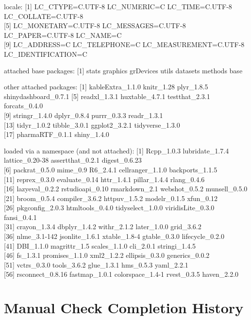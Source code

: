 \documentclass[]{article}
\begin{document}
locale: {[}1{]} LC\_CTYPE=C.UTF-8 LC\_NUMERIC=C LC\_TIME=C.UTF-8
LC\_COLLATE=C.UTF-8\\
{[}5{]} LC\_MONETARY=C.UTF-8 LC\_MESSAGES=C.UTF-8 LC\_PAPER=C.UTF-8
LC\_NAME=C\\
{[}9{]} LC\_ADDRESS=C LC\_TELEPHONE=C LC\_MEASUREMENT=C.UTF-8
LC\_IDENTIFICATION=C

attached base packages: {[}1{]} stats graphics grDevices utils datasets
methods base

other attached packages: {[}1{]} kableExtra\_1.1.0 knitr\_1.28
plyr\_1.8.5 shinydashboard\_0.7.1 {[}5{]} readxl\_1.3.1 huxtable\_4.7.1
testthat\_2.3.1 forcats\_0.4.0\\
{[}9{]} stringr\_1.4.0 dplyr\_0.8.4 purrr\_0.3.3 readr\_1.3.1\\
{[}13{]} tidyr\_1.0.2 tibble\_3.0.1 ggplot2\_3.2.1 tidyverse\_1.3.0\\
{[}17{]} pharmaRTF\_0.1.1 shiny\_1.4.0

loaded via a namespace (and not attached): {[}1{]} Rcpp\_1.0.3
lubridate\_1.7.4 lattice\_0.20-38 assertthat\_0.2.1 digest\_0.6.23\\
{[}6{]} packrat\_0.5.0 mime\_0.9 R6\_2.4.1 cellranger\_1.1.0
backports\_1.1.5\\
{[}11{]} reprex\_0.3.0 evaluate\_0.14 httr\_1.4.1 pillar\_1.4.4
rlang\_0.4.6\\
{[}16{]} lazyeval\_0.2.2 rstudioapi\_0.10 rmarkdown\_2.1 webshot\_0.5.2
munsell\_0.5.0\\
{[}21{]} broom\_0.5.4 compiler\_3.6.2 httpuv\_1.5.2 modelr\_0.1.5
xfun\_0.12\\
{[}26{]} pkgconfig\_2.0.3 htmltools\_0.4.0 tidyselect\_1.0.0
viridisLite\_0.3.0 fansi\_0.4.1\\
{[}31{]} crayon\_1.3.4 dbplyr\_1.4.2 withr\_2.1.2 later\_1.0.0
grid\_3.6.2\\
{[}36{]} nlme\_3.1-142 jsonlite\_1.6.1 xtable\_1.8-4 gtable\_0.3.0
lifecycle\_0.2.0\\
{[}41{]} DBI\_1.1.0 magrittr\_1.5 scales\_1.1.0 cli\_2.0.1
stringi\_1.4.5\\
{[}46{]} fs\_1.3.1 promises\_1.1.0 xml2\_1.2.2 ellipsis\_0.3.0
generics\_0.0.2\\
{[}51{]} vctrs\_0.3.0 tools\_3.6.2 glue\_1.3.1 hms\_0.5.3 yaml\_2.2.1\\
{[}56{]} rsconnect\_0.8.16 fastmap\_1.0.1 colorspace\_1.4-1 rvest\_0.3.5
haven\_2.2.0

\hypertarget{manual-check-completion-history}{%
\section{Manual Check Completion
History}\label{manual-check-completion-history}}
\end{document}

